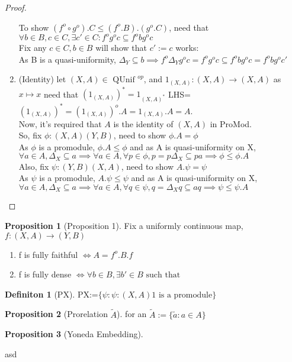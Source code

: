 \documentclass[18pt,a4paper]{article}
\makeatletter
\theoremstyle{definition}
\newtheorem{definition}{Definiton}[section]
\newtheorem{proop}{Proposition}[section]
\newcommand{\carrow}{}%
\DeclareRobustCommand{\carrow}{%
  \mathrel{\vphantom{\rightarrow}\mathpalette\circle@arrow\relax}%
}
\newcommand{\circle@arrow}[2]{%
  \m@th
  \ooalign{%
    \hidewidth$#1\circ\mkern1mu$\hidewidth\cr
    $#1\longrightarrow$\cr}%
}
\makeatother
\begin{document}
\begin{proof}
\begin{enumerate}[label=(\roman*)]
			To show $(f^o \circ g^o).C\leq(f^o .B).(g^o .C)$, need that
			$\forall b \in B, c \in C, \exists c' \in C: f^o g^o c \subseteq f^obg^oc $
			\\Fix any $c\in C, b\in B$ will show that $c':=c$ works:\\
			As B is a quasi-uniformity, $\Delta_Y \subseteq b\implies f^o \Delta_Y
			g^o c=f^o g^o c \subseteq f^o b	g^o c=f^o b g^o c'$
		\item(Identity) let $(X,A)\in \text{ QUnif }^{op} $, and
			$1_{(X,A)}:(X,A)\to(X,A)$ as $x\mapsto x$ need that
			$(1_{(X,A)})^*=1_{(X,A)^*}$
			LHS=$(1_{(X,A)})^*=(1_{(X,A)})^o.A=1_{(X,A)}.A=A$.
			\\Now, it's required that $A$ is the identity of $(X,A)$ in ProMod.\\
			So, fix $\phi:(X,A) \carrow (Y,B)$, need to show $\phi.A=\phi$\\
			As $\phi$ is a promodule, $\phi.A \leq \phi$ and as A is quasi-uniformity on X,\\
			$\forall a\in A, \Delta_X \subseteq a \implies
			\forall a \in A, \forall p \in \phi, p=p\Delta_X\subseteq pa \implies
			\phi \leq \phi.A$\\
			Also, fix $\psi:(Y,B) \carrow (X,A)$, need to show $A.\psi=\psi$\\
			As $\psi$ is a promodule, $A.\psi \leq \psi$ and as A is quasi-uniformity on X,\\
			$\forall a\in A, \Delta_X \subseteq a \implies
			\forall a \in A, \forall q \in \psi, q=\Delta_X q \subseteq aq \implies
			\psi \leq \psi.A$
	\end{enumerate}



\end{proof}
\newpage

\begin{proop}[Proposition 1]
	Fix a uniformly continuous map, $f:(X,A) \rightarrow (Y,B)$
	\begin{enumerate}[label=(\alph*)]
		\item f is fully faithful $\iff A=f^o.B.f$
		\item f is fully dense $\iff \forall b\in B, \exists b' \in B \text{ such that }  $

	\end{enumerate}
\end{proop}

\begin{definition}[PX] %
PX:=$\{\psi : \psi:(X,A) \carrow 1 \text{ is a promodule} \}$
\end{definition}

\begin{proop}[Prorelation $\tilde{A}$] %
	for an $\tilde{A}:=\{\tilde{a}:a \in A\}$
\end{proop}

\begin{proop}[Yoneda Embedding]

\end{proop}






\newpage
asd
\end{document}
